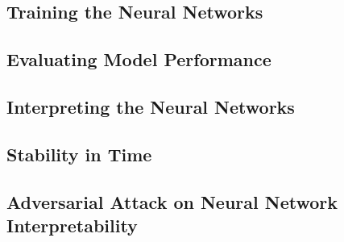 	\subsection{Training the Neural Networks}
	
	\subsection{Evaluating Model Performance}
	
	\subsection{Interpreting the Neural Networks}
	
	\subsection{Stability in Time}
	
	\subsection{Adversarial Attack on Neural Network Interpretability}
	
	


